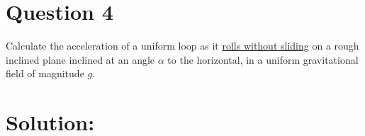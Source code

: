 \section*{Question 4}
Calculate the acceleration of a uniform loop as it \underline{rolls without sliding} on a rough inclined plane inclined at an angle $\alpha$ to the horizontal, in a uniform gravitational field of magnitude $g$.

\section*{Solution:}